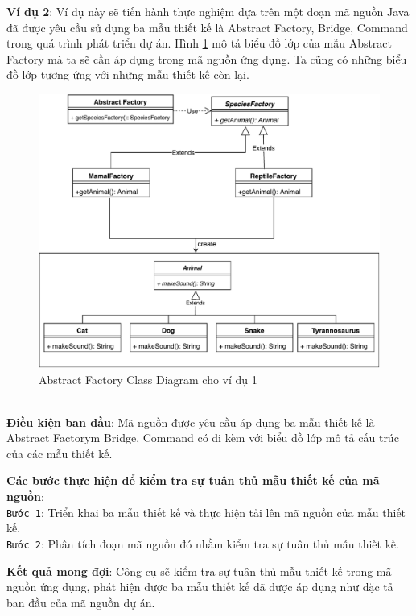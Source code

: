 \documentclass[12pt]{report}
\begin{document}
\newpage
\noindent \textbf{Ví dụ 2}: Ví dụ này sẽ tiến hành thực nghiệm dựa trên một đoạn mã nguồn Java đã được yêu cầu sử dụng ba mẫu thiết kế là Abstract Factory, Bridge, Command trong quá trình phát triển dự án. Hình \ref{fig:abstract_factory_diagram} mô tả biểu đồ lớp của mẫu Abstract Factory mà ta sẽ cần áp dụng trong mã nguồn ứng dụng. Ta cũng có những biểu đồ lớp tương ứng với những mẫu thiết kế còn lại.
\begin{figure}[h]
	\vspace{1cm}
	\centering
	\includegraphics[scale=0.8]{images/_abstract_factory.pdf}
	\caption{Abstract Factory Class Diagram cho ví dụ 1}
	\label{fig:abstract_factory_diagram}
\end{figure}\\
\noindent \textbf{Điều kiện ban đầu}: Mã nguồn được yêu cầu áp dụng ba mẫu thiết kế là Abstract Factorym Bridge, Command có đi kèm với biểu đồ lớp mô tả cấu trúc của các mẫu thiết kế.

\noindent \textbf{Các bước thực hiện để kiểm tra sự tuân thủ mẫu thiết kế của mã nguồn}:\\
\texttt{Bước 1}: Triển khai ba mẫu thiết kế và thực hiện tải lên mã nguồn của mẫu thiết kế.\\
\texttt{Bước 2}: Phân tích đoạn mã nguồn đó nhằm kiểm tra sự tuân thủ mẫu thiết kế.

\noindent \textbf{Kết quả mong đợi}: Công cụ sẽ kiểm tra sự tuân thủ mẫu thiết kế trong mã nguồn ứng dụng, phát hiện được ba mẫu thiết kế đã được áp dụng như đặc tả ban đầu của mã nguồn dự án.
\end{document}
